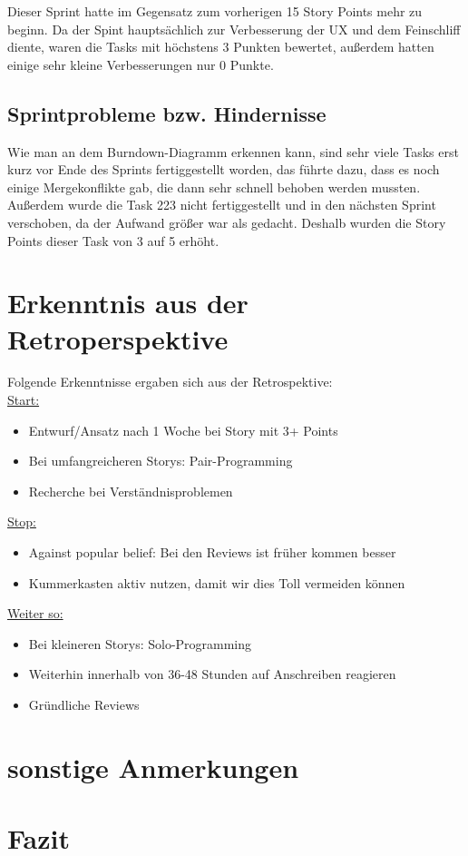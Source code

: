 \documentclass[12pt,a4paper, oneside]{article}
\begin{document}
        \noindent
        Dieser Sprint hatte im Gegensatz zum vorherigen 15 Story Points mehr zu beginn. Da der Spint hauptsächlich zur Verbesserung der UX und dem Feinschliff diente, waren die Tasks mit höchstens 3 Punkten bewertet, außerdem hatten einige sehr kleine Verbesserungen nur 0 Punkte.

    \subsection{Sprintprobleme bzw. Hindernisse}
    Wie man an dem Burndown-Diagramm erkennen kann, sind sehr viele Tasks erst kurz vor Ende des Sprints fertiggestellt worden, das führte dazu, dass es noch einige Mergekonflikte gab, die dann sehr schnell behoben werden mussten. Außerdem wurde die Task 223 nicht fertiggestellt und in den nächsten Sprint verschoben, da der Aufwand größer war als gedacht. Deshalb wurden die Story Points dieser Task von 3 auf 5 erhöht.

    \section{Erkenntnis aus der Retroperspektive}
    Folgende Erkenntnisse ergaben sich aus der Retrospektive:\\

    \underline{Start:}
    \begin{itemize}
        \item Entwurf/Ansatz nach 1 Woche bei Story mit 3+ Points
        \item Bei umfangreicheren Storys: Pair-Programming
        \item Recherche bei Verständnisproblemen
    \end{itemize}

    \underline{Stop:}
    \begin{itemize}
        \item Against popular belief: Bei den Reviews ist früher kommen besser
        \item Kummerkasten aktiv nutzen, damit wir dies Toll vermeiden können
    \end{itemize}

    \underline{Weiter so:}
    \begin{itemize}
        \item Bei kleineren Storys: Solo-Programming
        \item Weiterhin innerhalb von 36-48 Stunden auf Anschreiben reagieren
        \item Gründliche Reviews
    \end{itemize}

    \section{sonstige Anmerkungen}


    \section{Fazit}
\end{document}
